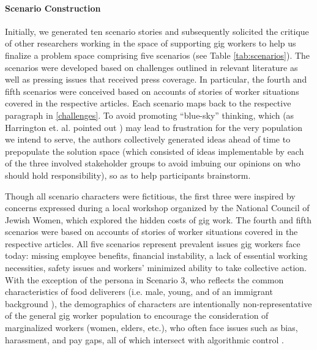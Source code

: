 \paragraph{Scenario Construction}
Initially, we generated ten scenario stories and subsequently solicited the critique of other researchers working in the space of supporting gig workers to help us finalize a problem space comprising five scenarios (see Table \ref{tab:scenarios}).
The scenarios were developed based on challenges outlined in relevant literature as well as pressing issues that received press coverage. In particular, the fourth \cite{Al_Jazeera2022-vz} and fifth \cite{noauthor_undated-xr} scenarios were conceived based on accounts of stories of worker situations covered in the respective articles. Each scenario maps back to the respective paragraph in 
\ref{challenges}.
To avoid promoting ``blue-sky'' thinking, which (as Harrington et. al. pointed out \cite{harrington2019deconstructing}) may lead to frustration for the very population we intend to serve, the authors collectively generated ideas ahead of time to prepopulate the solution space (which consisted of ideas implementable by each of the three involved stakeholder groups to avoid imbuing our opinions on who should hold responsibility), so as to help participants brainstorm.

Though all scenario characters were fictitious, the first three were inspired by concerns expressed during a local workshop organized by the National Council of Jewish Women, which explored the hidden costs of gig work. The fourth \cite{Al_Jazeera2022-vz} and fifth \cite{noauthor_undated-xr} scenarios were based on accounts of stories of worker situations covered in the respective articles. All five scenarios represent prevalent issues gig workers face today: missing employee benefits, financial instability, a lack of essential working necessities, safety issues and workers' minimized ability to take collective action. With the exception of the persona in Scenario 3, who reflects the common characteristics of food deliverers (i.e. male, young, and of an immigrant background \cite{ma2022brush}), the demographics of characters are intentionally non-representative of the general gig worker population to encourage the consideration of marginalized workers (women, elders, etc.), who often face issues such as bias, harassment, and pay gaps, all of which intersect with algorithmic control \cite{ma2022brush, anjali2021watched, foong2021understanding, still, jahanbakhsh2020experimental}.

